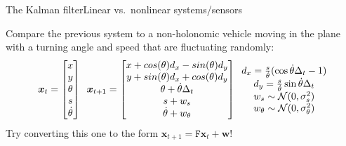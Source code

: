 \documentclass[aspectratio=169]{beamer}
\renewcommand{\vec}[1]{\boldsymbol{#1}}
\newcommand{\mat}[1]{\mathtt{#1}}
\begin{document}
\begin{frame}{The Kalman filter}{Linear vs.\ nonlinear systems/sensors}

Compare the previous system to a non-holonomic vehicle
moving in the plane with a turning angle and speed that are fluctuating
randomly:
$$ \vec{x}_t = \begin{bmatrix} x \\ y \\ \theta \\ s \\ \dot{\theta}
   \end{bmatrix} \;\;
   \vec{x}_{t+1} = \begin{bmatrix}
     x + cos(\theta) d_x - sin(\theta) d_y \\
     y + sin(\theta) d_x + cos(\theta) d_y \\
     \theta + \dot{\theta}\Delta_t \\
     s + w_s \\
     \dot{\theta} + w_\theta \end{bmatrix} \;\;
   \begin{matrix}
     d_x = \frac{s}{\dot{\theta}}(\cos \dot{\theta}\Delta_t - 1) \\
     d_y = \frac{s}{\dot{\theta}}\sin \dot{\theta}\Delta_t \\
     w_s \sim {\cal N}(0,\sigma^2_s) \\
     w_\theta \sim {\cal N}(0,\sigma^2_\theta)
   \end{matrix}
$$
Try converting this one to
the form $\vec{x}_{t+1} = \mat{F}\vec{x}_t + \vec{w}$!

\end{frame}
\end{document}
